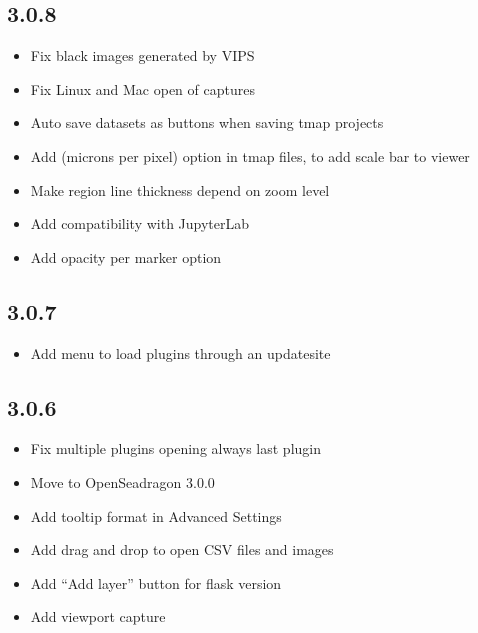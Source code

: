 \documentclass[letterpaper,10pt,english,openany,oneside]{sphinxmanual}
\begin{document}
\subsection{3.0.8}
\label{\detokenize{docs/intro/versions:id41}}\begin{itemize}
\item {} 
\sphinxAtStartPar
Fix black images generated by VIPS

\item {} 
\sphinxAtStartPar
Fix Linux and Mac open of captures

\item {} 
\sphinxAtStartPar
Auto save datasets as buttons when saving tmap projects

\item {} 
\sphinxAtStartPar
Add  (microns per pixel) option in tmap files, to add scale bar to viewer

\item {} 
\sphinxAtStartPar
Make region line thickness depend on zoom level

\item {} 
\sphinxAtStartPar
Add compatibility with JupyterLab

\item {} 
\sphinxAtStartPar
Add opacity per marker option

\end{itemize}


\subsection{3.0.7}
\label{\detokenize{docs/intro/versions:id42}}\begin{itemize}
\item {} 
\sphinxAtStartPar
Add menu to load plugins through an update\sphinxhyphen{}site

\end{itemize}


\subsection{3.0.6}
\label{\detokenize{docs/intro/versions:id43}}\begin{itemize}
\item {} 
\sphinxAtStartPar
Fix multiple plugins opening always last plugin

\item {} 
\sphinxAtStartPar
Move to OpenSeadragon 3.0.0

\item {} 
\sphinxAtStartPar
Add tooltip format in Advanced Settings

\item {} 
\sphinxAtStartPar
Add drag and drop to open CSV files and images

\item {} 
\sphinxAtStartPar
Add “Add layer” button for flask version

\item {} 
\sphinxAtStartPar
Add viewport capture

\end{itemize}
\end{document}
